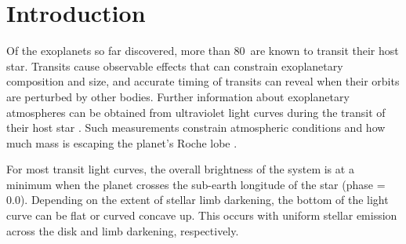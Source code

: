 \documentclass[manuscript]{aastex}
\newcommand{\numt}{80}
\begin{document}


\section{Introduction}
Of the exoplanets so far discovered, more than \numt\ are known to
transit their host star. Transits cause observable effects that can constrain exoplanetary composition and size, and accurate timing of transits can reveal when their orbits are perturbed by other bodies. Further information about exoplanetary atmospheres can be obtained from ultraviolet light curves during the transit of their host star \citep[see]{vidmad,benjaf7,mclay,lecav,fossati}. Such measurements constrain atmospheric conditions and how much mass is escaping the planet's Roche lobe \citep{knutsonprop,gmunoz,linsky}.

For most transit light curves, the overall brightness of the system is at a minimum when the planet crosses the sub-earth longitude of the star (phase = 0.0). Depending on the extent of stellar limb darkening, the bottom of the light curve can be flat or curved concave up. This occurs with uniform stellar emission across the disk and limb darkening, respectively.
%
\end{document}
